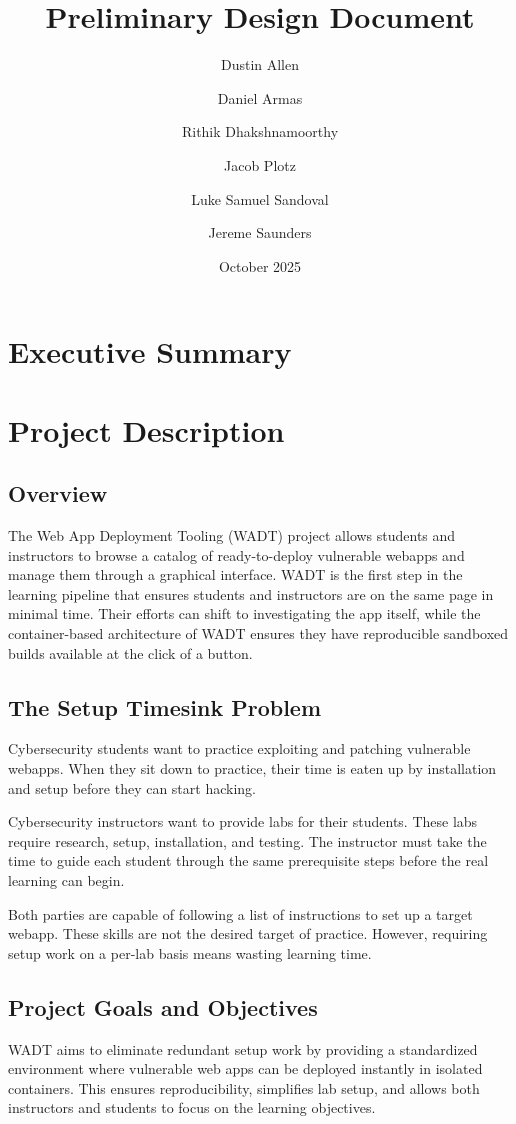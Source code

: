 \documentclass[12pt]{article}
\title{Preliminary Design Document}
\author{
	Dustin Allen
	\and
	Daniel Armas
	\and
	Rithik Dhakshnamoorthy
	\and
	Jacob Plotz
	\and
	Luke Samuel Sandoval
	\and
	Jereme Saunders
}
\date{October 2025}
\begin{document}
\maketitle

\tableofcontents

\section{Executive Summary}

\section{Project Description}

\subsection {Overview}
The Web App Deployment Tooling (WADT) project allows students and instructors to browse a catalog of ready-to-deploy vulnerable webapps and manage them through a graphical interface. WADT is the first step in the learning pipeline that ensures students and instructors are on the same page in minimal time. Their efforts can shift to investigating the app itself, while the container-based architecture of WADT ensures they have reproducible sandboxed builds available at the click of a button.

\subsection{The Setup Timesink Problem}
Cybersecurity students want to practice exploiting and patching vulnerable webapps. When they sit down to practice, their time is eaten up by installation and setup before they can start hacking.

Cybersecurity instructors want to provide labs for their students. These labs require research, setup, installation, and testing. The instructor must take the time to guide each student through the same prerequisite steps before the real learning can begin.

Both parties are capable of following a list of instructions to set up a target webapp. These skills are not the desired target of practice. However, requiring setup work on a per-lab basis means wasting learning time.

\subsection{Project Goals and Objectives}
WADT aims to eliminate redundant setup work by providing a standardized environment where vulnerable web apps can be deployed instantly in isolated containers. This ensures reproducibility, simplifies lab setup, and allows both instructors and students to focus on the learning objectives.
\end{document}
